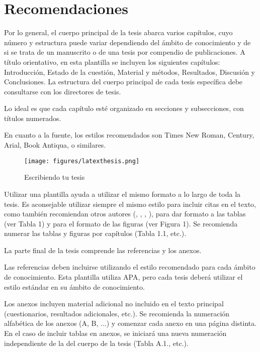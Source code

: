 \section{Recomendaciones}
Por lo general, el cuerpo principal de la tesis abarca varios capítulos, cuyo número y estructura puede variar dependiendo del ámbito de conocimiento y de si se trata de un manuscrito o de una tesis por compendio de publicaciones. A título orientativo, en esta plantilla se incluyen los siguientes capítulos: Introducción, Estado de la cuestión, Material y métodos, Resultados, Discusión y Conclusiones. La estructura del cuerpo principal de cada tesis específica debe consultarse con los directores de tesis. 

Lo ideal es que cada capítulo esté organizado en secciones y subsecciones, con títulos numerados.

En cuanto a la fuente, los estilos recomendados son Times New Roman, Century, Arial, Book Antiqua, o similares.

\begin{figure}[h]
\centering
    \texttt{[image: figures/latexthesis.png]}
\caption{Escribiendo tu tesis}
\label{phd1}
\end{figure}

Utilizar una plantilla ayuda a utilizar el mismo formato a lo largo de toda la tesis. Es aconsejable utilizar siempre el mismo estilo para incluir citas en el texto, como también recomiendan otros autores (\cite{bellDoingYourResearch2010}, \cite{carterIgnoringMePart2017}, \cite{odenaHowDoctoralStudents2017}, \cite{riveracaminoComoEscribirPublicar2014}), para dar formato a las tablas (ver Tabla 1) y para el formato de las figuras (ver Figura 1). Se recomienda numerar las tablas y figuras por capítulos (Tabla 1.1, etc.).

La parte final de la tesis comprende las referencias y los anexos.

Las referencias deben incluirse utilizando el estilo recomendado para cada ámbito de conocimiento. Esta plantilla utiliza APA, pero cada tesis deberá utilizar el estilo estándar en su ámbito de conocimiento.

Los anexos incluyen material adicional no incluido en el texto principal (cuestionarios, resultados adicionales, etc.). Se recomienda la numeración alfabética de los anexos (A, B, ...) y comenzar cada anexo en una página distinta. En el caso de incluir tablas en anexos, se iniciará una nueva numeración independiente de la del cuerpo de la tesis (Tabla A.1., etc.).





